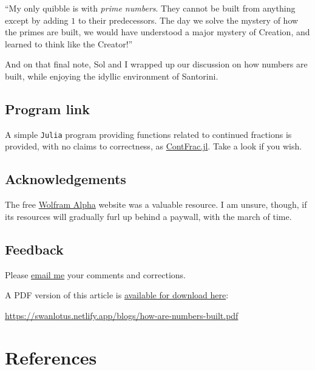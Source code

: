 \documentclass[
  a4paper,
]{article}
\begin{document}
``My only quibble is with \emph{prime numbers}. They cannot be built
from anything except by adding \(1\) to their predecessors. The day we
solve the mystery of how the primes are built, we would have understood
a major mystery of Creation, and learned to think like the Creator!''

And on that final note, Sol and I wrapped up our discussion on how
numbers are built, while enjoying the idyllic environment of Santorini.

\subsection{Program link}\label{program-link}

A simple \texttt{Julia} program providing functions related to continued
fractions is provided, with no claims to correctness, as
\href{auxiliary/ContFrac.jl}{ContFrac.jl}. Take a look if you wish.

\subsection{Acknowledgements}\label{acknowledgements}

The free \href{https://www.wolframalpha.com}{Wolfram Alpha} website was
a valuable resource. I am unsure, though, if its resources will
gradually furl up behind a paywall, with the march of time.

\subsection{Feedback}\label{feedback}

Please \href{mailto:feedback.swanlotus@gmail.com}{email me} your
comments and corrections.

\noindent A PDF version of this article is
\href{./how-are-numbers-built.pdf}{available for download here}:

\begin{small}

\begin{sffamily}

\url{https://swanlotus.netlify.app/blogs/how-are-numbers-built.pdf}

\end{sffamily}

\end{small}

\section*{References}\label{bibliography}
\end{document}
